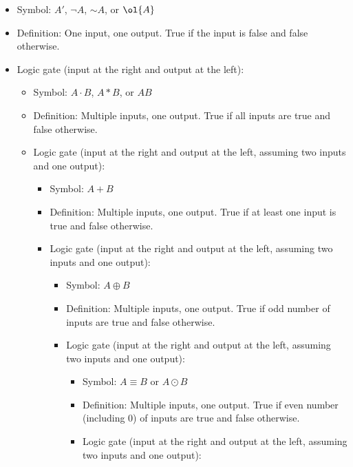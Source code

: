 \documentclass[a4paper,12pt]{article}
\begin{document}
\begin{itemize}
\item Symbol: $A'$, $\neg A$, $\mathord{\sim}A$, or $\ol{A}$
\item Definition: One input, one output. True if the input is false and false otherwise.
\item Logic gate (input at the right and output at the left):\mbox{}\\
\eit 
{}
\begin{itemize}
\item Symbol: $A \cdot B$, $A*B$, or $AB$
\item Definition: Multiple inputs, one output. True if all inputs are true and false otherwise.
\item Logic gate (input at the right and output at the left, assuming two inputs and one output):\mbox{}\\
\eit
{}
\begin{itemize}
\item Symbol: $A + B$
\item Definition: Multiple inputs, one output. True if at least one input is true and false otherwise.
\item Logic gate (input at the right and output at the left, assuming two inputs and one output):\mbox{}\\
\eit
{}
\begin{itemize}
\item Symbol: $A \oplus B$
\item Definition: Multiple inputs, one output. True if odd number of inputs are true and false otherwise.
\item Logic gate (input at the right and output at the left, assuming two inputs and one output):\mbox{}\\
\eit
{}
\begin{itemize}
\item Symbol: $A\equiv B$ or $A\odot B$
\item Definition: Multiple inputs, one output. True if even number (including 0) of inputs are true and false otherwise.
\item Logic gate (input at the right and output at the left, assuming two inputs and one output):\mbox{}\\
\eit
{}

\end{itemize}
\end{itemize}
\end{itemize}
\end{itemize}
\end{itemize}
\end{document}
